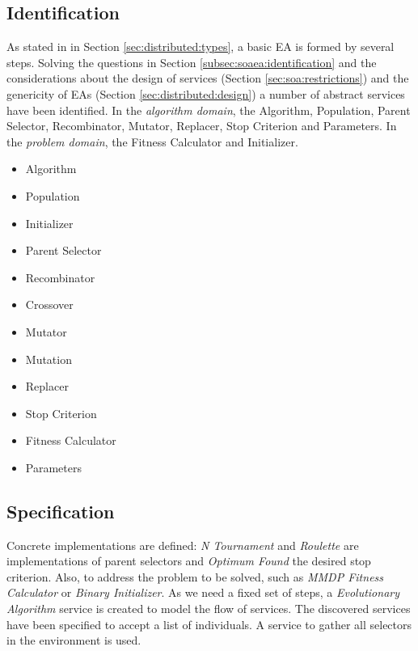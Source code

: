 \subsection{Identification}
As  stated in in Section \ref{sec:distributed:types}, a basic EA is formed by several steps. Solving the questions in Section \ref{subsec:soaea:identification} and the considerations about the design of services (Section \ref{sec:soa:restrictions}) and the genericity of EAs (Section \ref{sec:distributed:design}) a number of abstract services have been identified. In the {\em algorithm domain}, the Algorithm, Population, Parent Selector, Recombinator, Mutator, Replacer, Stop Criterion and Parameters. In the {\em problem domain}, the Fitness Calculator and Initializer. %



\begin{itemize}
\item Algorithm
\item Population
\item Initializer
\item Parent Selector
\item Recombinator
\item Crossover
\item Mutator
\item Mutation
\item Replacer
\item Stop Criterion
\item Fitness Calculator
\item Parameters
\end{itemize}

\subsection{Specification}

 Concrete implementations are defined: {\em N Tournament} and {\em Roulette} are implementations of parent selectors and {\em Optimum Found} the desired stop criterion. Also, to address the problem to be solved, such as {\em MMDP Fitness Calculator} or {\em Binary Initializer}. As we need a fixed set of steps, a {\em Evolutionary Algorithm} service is created to model the flow of services. The discovered services have been specified to accept  a list of individuals. A service to gather all selectors in the environment is used.

